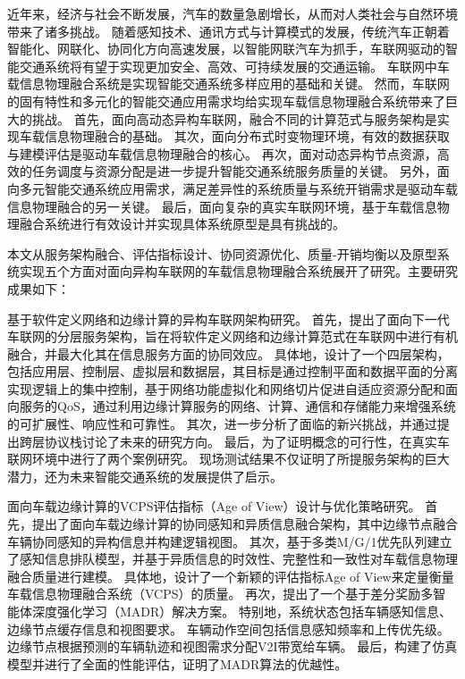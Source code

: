 \begin{cabstract}	%

近年来，经济与社会不断发展，汽车的数量急剧增长，从而对人类社会与自然环境带来了诸多挑战。
随着感知技术、通讯方式与计算模式的发展，传统汽车正朝着智能化、网联化、协同化方向高速发展，以智能网联汽车为抓手，车联网驱动的智能交通系统将有望于实现更加安全、高效、可持续发展的交通运输。
车联网中车载信息物理融合系统是实现智能交通系统多样应用的基础和关键。
然而，车联网的固有特性和多元化的智能交通应用需求均给实现车载信息物理融合系统带来了巨大的挑战。
首先，面向高动态异构车联网，融合不同的计算范式与服务架构是实现车载信息物理融合的基础。
其次，面向分布式时变物理环境，有效的数据获取与建模评估是驱动车载信息物理融合的核心。
再次，面对动态异构节点资源，高效的任务调度与资源分配是进一步提升智能交通系统服务质量的关键。
另外，面向多元智能交通系统应用需求，满足差异性的系统质量与系统开销需求是驱动车载信息物理融合的另一关键。
最后，面向复杂的真实车联网环境，基于车载信息物理融合系统进行有效设计并实现具体系统原型是具有挑战的。

本文从服务架构融合、评估指标设计、协同资源优化、质量-开销均衡以及原型系统实现五个方面对面向异构车联网的车载信息物理融合系统展开了研究。主要研究成果如下：

 基于软件定义网络和边缘计算的异构车联网架构研究。
首先，提出了面向下一代车联网的分层服务架构，旨在将软件定义网络和边缘计算范式在车联网中进行有机融合，并最大化其在信息服务方面的协同效应。
具体地，设计了一个四层架构，包括应用层、控制层、虚拟层和数据层，其目标是通过控制平面和数据平面的分离实现逻辑上的集中控制，基于网络功能虚拟化和网络切片促进自适应资源分配和面向服务的QoS，通过利用边缘计算服务的网络、计算、通信和存储能力来增强系统的可扩展性、响应性和可靠性。
其次，进一步分析了面临的新兴挑战，并通过提出跨层协议栈讨论了未来的研究方向。
最后，为了证明概念的可行性，在真实车联网环境中进行了两个案例研究。
现场测试结果不仅证明了所提服务架构的巨大潜力，还为未来智能交通系统的发展提供了启示。

 面向车载边缘计算的VCPS评估指标（Age of View）设计与优化策略研究。
首先，提出了面向车载边缘计算的协同感知和异质信息融合架构，其中边缘节点融合车辆协同感知的异构信息并构建逻辑视图。
其次，基于多类M/G/1优先队列建立了感知信息排队模型，并基于异质信息的时效性、完整性和一致性对车载信息物理融合质量进行建模。
具体地，设计了一个新颖的评估指标Age of View来定量衡量车载信息物理融合系统（VCPS）的质量。
再次，提出了一个基于差分奖励多智能体深度强化学习（MADR）解决方案。
特别地，系统状态包括车辆感知信息、边缘节点缓存信息和视图要求。
车辆动作空间包括信息感知频率和上传优先级。
边缘节点根据预测的车辆轨迹和视图需求分配V2I带宽给车辆。
最后，构建了仿真模型并进行了全面的性能评估，证明了MADR算法的优越性。


\end{cabstract}
